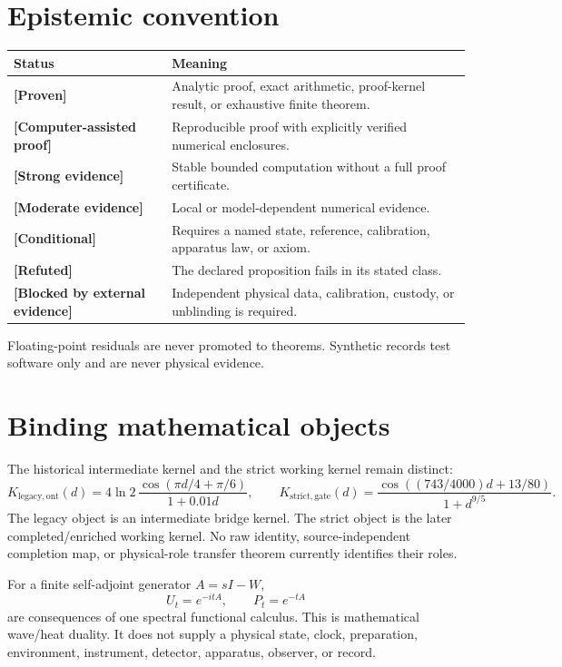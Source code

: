 \documentclass[11pt,a4paper]{article}
\newcommand{\status}[1]{\textbf{[#1]}}
\newcommand{\Klegacy}{K_{\mathrm{legacy,ont}}}
\newcommand{\Kstrict}{K_{\mathrm{strict,gate}}}
\begin{document}
\section{Epistemic convention}
\begin{longtable}{p{}p{}}
\toprule
Status & Meaning\\\midrule
\status{Proven} & Analytic proof, exact arithmetic, proof-kernel result, or exhaustive finite theorem.\\
\status{Computer-assisted proof} & Reproducible proof with explicitly verified numerical enclosures.\\
\status{Strong evidence} & Stable bounded computation without a full proof certificate.\\
\status{Moderate evidence} & Local or model-dependent numerical evidence.\\
\status{Conditional} & Requires a named state, reference, calibration, apparatus law, or axiom.\\
\status{Refuted} & The declared proposition fails in its stated class.\\
\status{Blocked by external evidence} & Independent physical data, calibration, custody, or unblinding is required.\\
\bottomrule
\end{longtable}
Floating-point residuals are never promoted to theorems. Synthetic records
test software only and are never physical evidence.

\section{Binding mathematical objects}
The historical intermediate kernel and the strict working kernel remain
distinct:
\[
\Klegacy(d)=4\ln2\,\frac{\cos(\pi d/4+\pi/6)}{1+0.01d},
\qquad
\Kstrict(d)=\frac{\cos((743/4000)d+13/80)}{1+d^{9/5}}.
\]
The legacy object is an intermediate bridge kernel. The strict object is the
later completed/enriched working kernel. No raw identity,
source-independent completion map, or physical-role transfer theorem
currently identifies their roles.

For a finite self-adjoint generator $A=sI-W$,
\[
U_t=e^{-itA},\qquad P_t=e^{-tA}
\]
are consequences of one spectral functional calculus. This is mathematical
wave/heat duality. It does not supply a physical state, clock, preparation,
environment, instrument, detector, apparatus, observer, or record.
\end{document}

